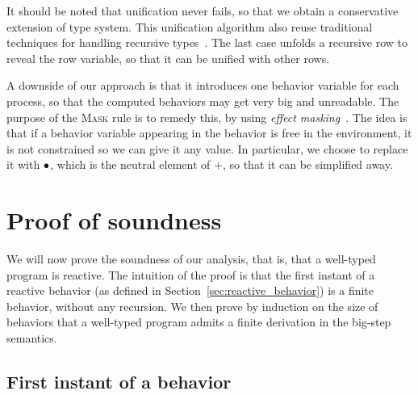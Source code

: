 \documentclass[9pt,preprint]{sigplanconf}
\begin{document}
%
It should be noted that unification never fails, so that we obtain a conservative extension of \rml type system. This unification algorithm also reuse traditional techniques for handling recursive types~\cite{Huet:1975}. The last case unfolds a recursive row to reveal the row variable, so that it can be unified with other rows. 

A downside of our approach is that it introduces one behavior variable for each process, so that the computed behaviors may get very big and unreadable. The purpose of the \textsc{Mask} rule is to remedy this, by using \emph{effect masking}~\cite{Lucassen:1988}. The idea is that if a behavior variable appearing in the behavior is free in the environment, it is not constrained so we can give it any value. In particular, we choose to replace it with $\bullet$, which is the neutral element of $+$, so that it can be simplified away.


\section{Proof of soundness}
\label{sec:soundness}



We will now prove the soundness of our analysis, that is, that a well-typed program is reactive. The intuition of the proof is that the first instant of a reactive behavior (as defined in Section~\ref{sec:reactive_behavior}) is a finite behavior, without any recursion. We then prove by induction on the size of behaviors that a well-typed program admits a finite derivation in the big-step semantics.

\subsection{First instant of a behavior}
\end{document}
